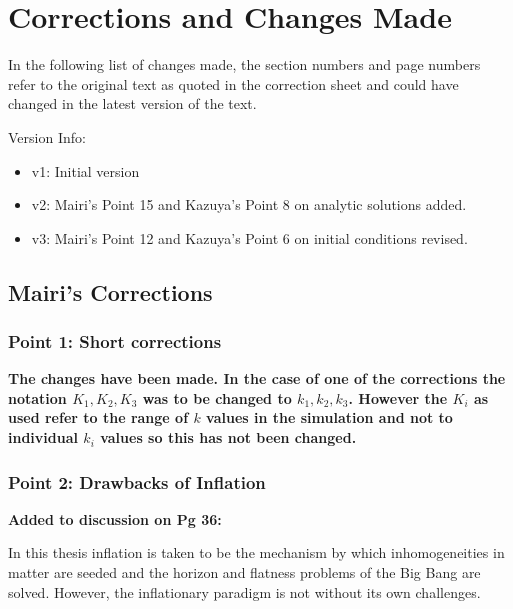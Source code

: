 \chapter{Corrections and Changes Made}
\label{ch:corr}

In the following list of changes made, the section numbers and page numbers refer to the original
text as quoted in the correction sheet and could have changed in the latest version of the text.

Version Info:
\begin{itemize}
 \item v1: Initial version
 \item v2: Mairi's Point 15 and Kazuya's Point 8 on analytic solutions added.
 \item v3: Mairi's Point 12 and Kazuya's Point 6 on initial conditions revised.
\end{itemize}


\section{Mairi's Corrections}

\subsection{Point 1: Short corrections}
\textbf{The changes have been made. 
In the case of one of the corrections the notation $K_1,K_2,K_3$ was to be changed to
$k_1,k_2,k_3$. However the $K_i$ as used refer to the range of $k$ values in the simulation and
not to individual $k_i$ values so this has not been changed.}

\subsection{Point 2: Drawbacks of Inflation}
\textbf{Added to discussion on Pg 36:}

In this thesis inflation is taken to be the mechanism by which inhomogeneities in matter are seeded
and the horizon and flatness problems of the Big Bang are solved. However, the inflationary
paradigm is not without its own challenges.

